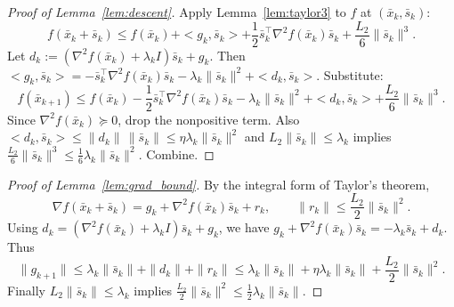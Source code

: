 \documentclass[11pt,a4paper]{article}
\def\ip#1#2{<#1,#2>}%
\newcommand{\ip}[2]{\left\langle #1,#2\right\rangle}
\begin{document}
\begin{proof}[Proof of Lemma~\ref{lem:descent}]
Apply Lemma~\ref{lem:taylor3} to $f$ at $(\bar x_k,\bar s_k)$:
\[
f(\bar x_k+\bar s_k)\le f(\bar x_k)+\ip{g_k}{\bar s_k}+\frac12\bar s_k^\top\nabla^2 f(\bar x_k)\bar s_k+\frac{L_2}{6}\|\bar s_k\|^3.
\]
Let $d_k:=(\nabla^2 f(\bar x_k)+\lambda_k I)\bar s_k+g_k$.
Then $\ip{g_k}{\bar s_k}=-\bar s_k^\top\nabla^2 f(\bar x_k)\bar s_k-\lambda_k\|\bar s_k\|^2+\ip{d_k}{\bar s_k}$.
Substitute:
\[
f(\bar x_{k+1})\le f(\bar x_k)-\frac12\bar s_k^\top\nabla^2 f(\bar x_k)\bar s_k-\lambda_k\|\bar s_k\|^2+\ip{d_k}{\bar s_k}+\frac{L_2}{6}\|\bar s_k\|^3.
\]
Since $\nabla^2 f(\bar x_k)\succeq 0$, drop the nonpositive term. Also
$\ip{d_k}{\bar s_k}\le \|d_k\|\,\|\bar s_k\|\le \eta\lambda_k\|\bar s_k\|^2$
and $L_2\|\bar s_k\|\le \lambda_k$ implies $\frac{L_2}{6}\|\bar s_k\|^3\le \frac16\lambda_k\|\bar s_k\|^2$.
Combine.
\end{proof}

\begin{proof}[Proof of Lemma~\ref{lem:grad_bound}]
By the integral form of Taylor's theorem,
\[
\nabla f(\bar x_k+\bar s_k)=g_k+\nabla^2 f(\bar x_k)\bar s_k+r_k,
\qquad \|r_k\|\le \frac{L_2}{2}\|\bar s_k\|^2.
\]
Using $d_k=(\nabla^2 f(\bar x_k)+\lambda_k I)\bar s_k+g_k$, we have
$g_k+\nabla^2 f(\bar x_k)\bar s_k=-\lambda_k\bar s_k+d_k$.
Thus
\[
\|g_{k+1}\|\le \lambda_k\|\bar s_k\|+\|d_k\|+\|r_k\|
\le \lambda_k\|\bar s_k\|+\eta\lambda_k\|\bar s_k\|+\frac{L_2}{2}\|\bar s_k\|^2.
\]
Finally $L_2\|\bar s_k\|\le \lambda_k$ implies $\frac{L_2}{2}\|\bar s_k\|^2\le \frac12\lambda_k\|\bar s_k\|$.
\end{proof}
\end{document}
